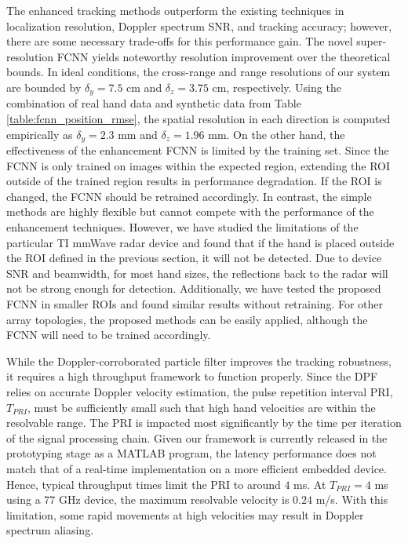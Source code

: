 \documentclass[10pt,journal,final]{IEEEtran}
\begin{document}

The enhanced tracking methods outperform the existing techniques in localization resolution, Doppler spectrum SNR, and tracking accuracy; however, there are some necessary trade-offs for this performance gain. 
The novel super-resolution FCNN yields noteworthy resolution improvement over the theoretical bounds.
In ideal conditions, the cross-range and range resolutions of our system are bounded by $\delta_y = 7.5$ cm and $\delta_z = 3.75$ cm, respectively.
Using the combination of real hand data and synthetic data from Table \ref{table:fcnn_position_rmse}, the spatial resolution in each direction is computed empirically as $\delta_y = 2.3$ mm and $\delta_z = 1.96$ mm. 
On the other hand, the effectiveness of the enhancement FCNN is limited by the training set. 
Since the FCNN is only trained on images within the expected region, extending the ROI outside of the trained region results in performance degradation. 
If the ROI is changed, the FCNN should be retrained accordingly.
In contrast, the simple methods are highly flexible but cannot compete with the performance of the enhancement techniques.
However, we have studied the limitations of the particular TI mmWave radar device and found that if the hand is placed outside the ROI defined in the previous section, it will not be detected.
Due to device SNR and beamwidth, for most hand sizes, the reflections back to the radar will not be strong enough for detection.
Additionally, we have tested the proposed FCNN in smaller ROIs and found similar results without retraining.
For other array topologies, the proposed methods can be easily applied, although the FCNN will need to be trained accordingly.

While the Doppler-corroborated particle filter improves the tracking robustness, it requires a high throughput framework to function properly.
Since the DPF relies on accurate Doppler velocity estimation, the pulse repetition interval PRI, $T_{PRI}$, must be sufficiently small such that high hand velocities are within the resolvable range.
The PRI is impacted most significantly by the time per iteration of the signal processing chain.
Given our framework is currently released in the prototyping stage as a MATLAB program, the latency performance does not match that of a real-time implementation on a more efficient embedded device.
Hence, typical throughput times limit the PRI to around $4$ ms.
At $T_{PRI} = 4$ ms using a $77$ GHz device, the maximum resolvable velocity is $0.24$ m/s.
With this limitation, some rapid movements at high velocities may result in Doppler spectrum aliasing.
\end{document}
